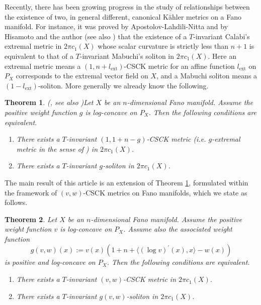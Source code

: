 \documentclass[12pt]{amsart}
\numberwithin{equation}{section}%
\theoremstyle{plain}
\newtheorem{theorem}{Theorem}[section]
\theoremstyle{definition}
\newcommand{\1}{\mathbf{1}}
\begin{document}
Recently, there has been growing progress in the study of relationships
between the existence of two, in general different, canonical K\"ahler metrics
on a Fano manifold.
For instance, it was proved by Apostolov-Lahdili-Nitta \cite{ALN25} and
by Hisamoto and the author \cite{HN24} (see also \cite[Section 9.6]{Ma21}) that
the existence of a $T$-invariant Calabi's extremal metric \cite{Ca82} in $2\pi c_{1}(X)$
whose scalar curvature is strictly less than $n+1$
is equivalent to that of a $T$-invariant Mabuchi's soliton \cite{Ma01} in $2\pi c_{1}(X)$.
Here an extremal metric means a $(1,n+l_{\mathrm{ext}})$-CSCK metric
for an affine function $l_{\mathrm{ext}}$ on $P_{X}$
corresponds to the extremal vector field \cite{FM95} on $X$,
and a Mabuchi soliton means a $(1-l_{\mathrm{ext}})$-soliton.
More generally we already know the following.

\begin{theorem}{\rm (\cite{ALN25, HN24}, see also \cite{NN25})}\label{meta theorem}
Let $X$ be an $n$-dimensional Fano manifold.
Assume the positive weight function $g$ is log-concave on $P_{X}$.
Then the following conditions are equivalent.
\begin{enumerate}
\item There exists a $T$-invariant $(1, 1+n-g)$-CSCK metric
(i.e. $g$-extremal metric in the sense of \cite{HN24, NN25})
in $2\pi c_{1}(X)$.
\item There exists a $T$-invariant $g$-soliton in $2\pi c_{1}(X)$.
\end{enumerate}
\end{theorem}

The main result of this article is an extension of Theorem \ref{meta theorem},
formulated within the framework of $(v,w)$-CSCK metrics
on Fano manifolds, which we state as follows.

\begin{theorem}\label{main theorem}
Let $X$ be an $n$-dimensional Fano manifold.
Assume the positive weight function $v$ is log-concave on $P_{X}$.
Assume also the associated weight function
\begin{equation}\label{g(v,w)}
g(v,w)(x):=v(x)(1+n+\langle(\log v)^{\prime}(x),x\rangle -w(x))
\end{equation}
is positive and log-concave on $P_{X}$.
Then the following conditions
are equivalent.
\begin{enumerate}
\item There exists a $T$-invariant $(v,w)$-CSCK metric in $2\pi c_{1}(X)$.
\item There exists a $T$-invariant $g(v,w)$-soliton in $2\pi c_{1}(X)$.
\end{enumerate}
\end{theorem}
\end{document}
